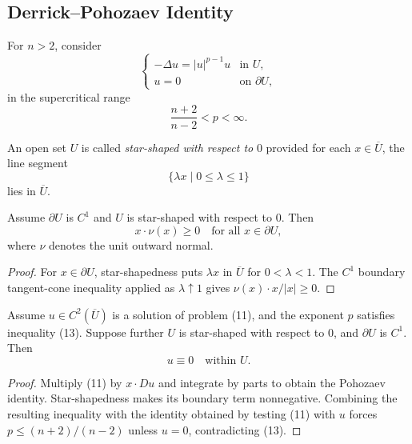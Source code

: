 \subsection{Derrick--Pohozaev Identity}
\label{sec:derrick-pohozaev-identity}

For $n>2$, consider
\[
\begin{cases}
-\Delta u=|u|^{p-1}u & \text{in }U,\\
u=0 & \text{on }\partial U,
\end{cases}
\tag{11}
\]
in the supercritical range
\[
\frac{n+2}{n-2}<p<\infty.
\tag{13}
\]

\begin{definition}
\label{def:star-shaped-domain}
An open set $U$ is called \textit{star-shaped with respect to} $0$ provided for each $x \in \overline{U}$, the line segment
\[
\{\lambda x \mid 0 \leq \lambda \leq 1\}
\]
lies in $\overline{U}$.
\end{definition}

\begin{lemma}
\label{lem:normals-star-shaped-region}
Assume $\partial U$ is $C^1$ and $U$ is star-shaped with respect to 0. Then
\[
x \cdot \nu(x) \geq 0 \quad \text{for all } x \in \partial U,
\]
where $\nu$ denotes the unit outward normal.
\end{lemma}

\begin{proof}
\sketch For $x\in\partial U$, star-shapedness puts $\lambda x$ in $\overline U$ for $0<\lambda<1$. The $C^1$ boundary tangent-cone inequality applied as $\lambda\uparrow1$ gives $\nu(x)\cdot x/|x|\geq0$.
\end{proof}

\begin{theorem}
\label{thm:derrick-pohozaev-nonexistence}
Assume $u \in C^2(\overline{U})$ is a solution of problem (11), and the exponent $p$ satisfies inequality (13). Suppose further $U$ is star-shaped with respect to 0, and $\partial U$ is $C^1$. Then
\[
u \equiv 0 \quad \text{within } U.
\]
\end{theorem}

\begin{proof}
\sketch Multiply (11) by $x\cdot Du$ and integrate by parts to obtain the Pohozaev identity. Star-shapedness makes its boundary term nonnegative. Combining the resulting inequality with the identity obtained by testing (11) with $u$ forces $p\leq(n+2)/(n-2)$ unless $u=0$, contradicting (13).
\end{proof}


